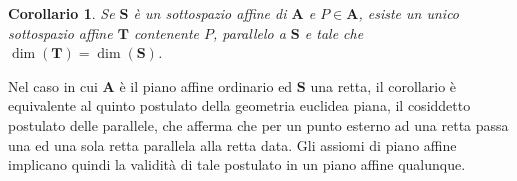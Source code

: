 \documentclass{article}
\theoremstyle{plain}
\newtheorem{cor}{Corollario}
\theoremstyle{definition}
\theoremstyle{remark}
\begin{document}
\vspace{10pt}

\begin{bxthm}
\begin{cor}\label{corparalleli}
    Se $\mathbf{S}$ è un sottospazio affine di $\mathbf{A}$ e $P\in\mathbf{A}$, esiste un unico sottospazio affine $\mathbf{T}$ contenente $P$, parallelo a $\mathbf{S}$ e tale che $\dim(\mathbf{T})=\dim(\mathbf{S})$.
\end{cor}
\end{bxthm}

\vspace{10pt}

Nel caso in cui $\mathbf{A}$ è il piano affine ordinario ed $\mathbf{S}$ una retta, il corollario è equivalente al quinto postulato della geometria euclidea piana, il cosiddetto postulato delle parallele, che afferma che per un punto esterno ad una retta passa una ed una sola retta parallela alla retta data.
Gli assiomi di piano affine implicano quindi la validità di tale postulato in un piano affine qualunque.

\vspace{10pt}
\end{document}
